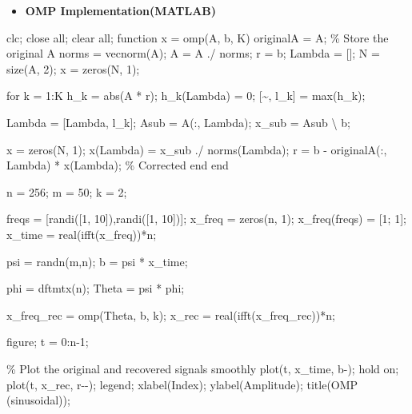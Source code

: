 \documentclass[
  letterpaper,
  DIV=11,
  numbers=noendperiod]{scrartcl}
\newenvironment{Shaded}{\begin{snugshade}}{\end{snugshade}}
\newcommand{\NormalTok}[1]{\textcolor[rgb]{0.97,0.97,0.95}{#1}}
\providecommand{\tightlist}{%
  \setlength{\itemsep}{0pt}\setlength{\parskip}{0pt}}
\begin{document}
\begin{itemize}
\tightlist
\item
  \textbf{OMP Implementation(MATLAB)}
\end{itemize}

\begin{Shaded}
\begin{Highlighting}[]
\NormalTok{clc; close all; clear all;}
\NormalTok{function x = omp(A, b, K)}
\NormalTok{    originalA = A;               \% Store the original A}
\NormalTok{    norms = vecnorm(A);}
\NormalTok{    A = A ./ norms;}
\NormalTok{    r = b;}
\NormalTok{    Lambda = [];}
\NormalTok{    N = size(A, 2);}
\NormalTok{    x = zeros(N, 1);}

\NormalTok{    for k = 1:K}
\NormalTok{        h\_k = abs(A\textquotesingle{} * r);}
\NormalTok{        h\_k(Lambda) = 0;}
\NormalTok{        [\textasciitilde{}, l\_k] = max(h\_k);}

\NormalTok{        Lambda = [Lambda, l\_k];}
\NormalTok{        Asub = A(:, Lambda);}
\NormalTok{        x\_sub = Asub \textbackslash{} b;}

\NormalTok{        x = zeros(N, 1);}
\NormalTok{        x(Lambda) = x\_sub ./ norms(Lambda)\textquotesingle{};}
\NormalTok{        r = b {-} originalA(:, Lambda) * x(Lambda);   \% Corrected}
\NormalTok{    end}
\NormalTok{end}

\NormalTok{n = 256;     }
\NormalTok{m = 50;      }
\NormalTok{k = 2;        }

\NormalTok{freqs = [randi([1, 10]),randi([1, 10])];              }
\NormalTok{x\_freq = zeros(n, 1);              }
\NormalTok{x\_freq(freqs) = [1; 1];            }
\NormalTok{x\_time = real(ifft(x\_freq))*n;       }

\NormalTok{psi = randn(m,n);                  }
\NormalTok{b = psi * x\_time;                     }

\NormalTok{phi = dftmtx(n);}
\NormalTok{Theta = psi * phi\textquotesingle{};                    }

\NormalTok{x\_freq\_rec = omp(Theta, b, k);      }
\NormalTok{x\_rec = real(ifft(x\_freq\_rec))*n;    }

\NormalTok{figure;}
\NormalTok{t = 0:n{-}1;}

\NormalTok{\% Plot the original and recovered signals smoothly}
\NormalTok{plot(t, x\_time, \textquotesingle{}b{-}\textquotesingle{}); hold on;}
\NormalTok{plot(t, x\_rec, \textquotesingle{}r{-}{-}\textquotesingle{});}
\NormalTok{legend;}
\NormalTok{xlabel(\textquotesingle{}Index\textquotesingle{});}
\NormalTok{ylabel(\textquotesingle{}Amplitude\textquotesingle{});}
\NormalTok{title(\textquotesingle{}OMP (sinusoidal)\textquotesingle{});}
\end{Highlighting}
\end{Shaded}
\end{document}
